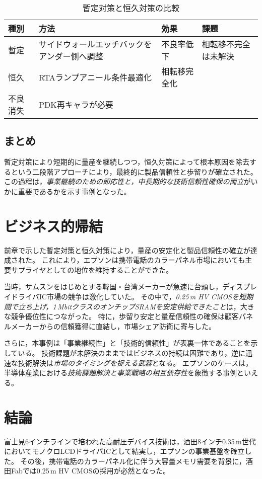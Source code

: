 \documentclass[conference]{IEEEtran}
\begin{document}
\begin{table}[!t]
\centering
\caption{暫定対策と恒久対策の比較}
\label{tab:countermeasures}
\begin{tabularx}{\columnwidth}{l X X X}
\toprule
種別 & 方法 & 効果 & 課題 \\
\midrule
暫定 & サイドウォールエッチバックをアンダー側へ調整
     & 不良率低下
     & 相転移不完全は未解決 \\

恒久 & RTAランプアニール条件最適化
     & 相転移完全化 \\ 不良消失
     & PDK再キャラが必要 \\
\bottomrule
\end{tabularx}
\end{table}

\subsection{まとめ}
暫定対策により短期的に量産を継続しつつ，恒久対策によって根本原因を除去するという二段階アプローチにより，最終的に製品信頼性と歩留りが確立された。  
この過程は，\emph{事業継続のための即応性と，中長期的な技術信頼性確保の両立}がいかに重要であるかを示す事例となった。

\section{ビジネス的帰結}
前章で示した暫定対策と恒久対策により，量産の安定化と製品信頼性の確立が達成された。  
これにより，エプソンは携帯電話のカラーパネル市場においても主要サプライヤとしての地位を維持することができた。  

当時，サムスンをはじめとする韓国・台湾メーカーが急速に台頭し，ディスプレイドライバIC市場の競争は激化していた。  
その中で，\emph{0.25\,\textmu m HV CMOSを短期間で立ち上げ，1\,MbitクラスのオンチップSRAMを安定供給できたこと}は，大きな競争優位性につながった。  
特に，歩留り安定と量産信頼性の確保は顧客パネルメーカーからの信頼獲得に直結し，市場シェア防衛に寄与した。  

さらに，本事例は「事業継続性」と「技術的信頼性」が表裏一体であることを示している。  
技術課題が未解決のままではビジネスの持続は困難であり，逆に迅速な技術解決は\emph{市場のタイミングを捉える武器}となる。  
エプソンのケースは，半導体産業における\emph{技術課題解決と事業戦略の相互依存性}を象徴する事例といえる。

\section{結論}
富士見6インチラインで培われた高耐圧デバイス技術は，酒田8インチ0.35\,\textmu m世代においてモノクロLCDドライバICとして結実し，エプソンの事業基盤を確立した。  
その後，携帯電話のカラーパネル化に伴う大容量メモリ需要を背景に，酒田Fabでは0.25\,\textmu m HV CMOSの採用が必然となった。  
\end{document}
